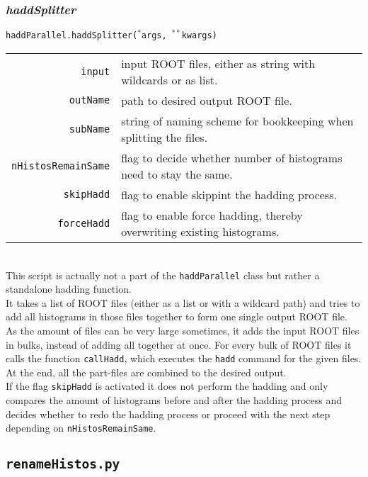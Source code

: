 \documentclass[12pt, a4paper]{article}
\newcommand{\args}{$^*$args}
\newcommand{\kwargs}{$^{**}$kwargs}
\begin{document}
\subsubsection{\textit{haddSplitter}}
\texttt{haddParallel.haddSplitter(\args, \kwargs)}\\
\begin{tabular}{r|l}
\hline
\texttt{input}				&	input ROOT files, either as string with wildcards or as list.\\
\texttt{outName}			&	path to desired output ROOT file.\\
\texttt{subName}			&	string of naming scheme for bookkeeping when splitting the files.\\
\texttt{nHistosRemainSame}	&	flag to decide whether number of histograms need to stay the same.\\
\texttt{skipHadd}			&	flag to enable skippint the hadding process.\\
\texttt{forceHadd}			&	flag to enable force hadding, thereby overwriting existing histograms.\\
\hline
\end{tabular}
\\
This script is actually not a part of the \texttt{haddParallel} class but rather a standalone hadding function.\\
It takes a list of ROOT files (either as a list or with a wildcard path) and tries to add all histograms in those files together to form one single output ROOT file.\\
As the amount of files can be very large sometimes, it adds the input ROOT files in bulks, instead of adding all together at once. For every bulk of ROOT files it calls the function \texttt{callHadd}, which executes the \texttt{hadd} command for the given files. At the end, all the part-files are combined to the desired output.\\
If the flag \texttt{skipHadd} is activated it does not perform the hadding and only compares the amount of histograms before and after the hadding process and decides whether to redo the hadding process or proceed with the next step depending on \texttt{nHistosRemainSame}.




\subsection{\texttt{renameHistos.py}}
\end{document}
